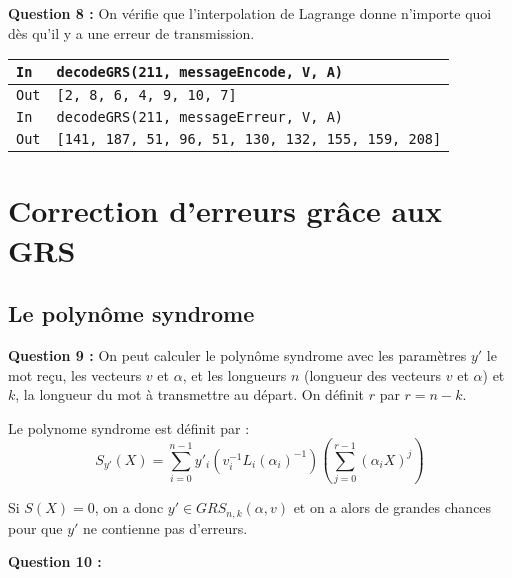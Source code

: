 \documentclass[titlepage]{article}
\begin{document}
        \textbf{Question 8 :}
        On vérifie que l'interpolation de Lagrange donne n'importe quoi dès qu'il y a une erreur de transmission.

        \begin{tabularx}{12cm}{|p{0.60cm}|X|}
            \hline
            \rowcolor{gray}
            \texttt{In}
            & 
            \texttt{decodeGRS(211, messageEncode, V, A)}
            \\
            \hline
            \texttt{Out}
            &
            \texttt{[2, 8, 6, 4, 9, 10, 7]}
            \\
            \hline
            \rowcolor{gray}
            \texttt{In}
            & 
            \texttt{decodeGRS(211, messageErreur, V, A)}
            \\
            \hline
            \texttt{Out}
            &
            \texttt{[141, 187, 51, 96, 51, 130, 132, 155, 159, 208]}
            \\
            \hline
        \end{tabularx}
        \bigbreak

    \section{Correction d’erreurs grâce aux GRS}
        \subsection{Le polynôme syndrome}
        \textbf{Question 9 :}
        On peut calculer le polynôme syndrome avec les paramètres $y'$ le mot reçu, les vecteurs $v$ et $\alpha$, 
        et les longueurs $n$ (longueur des vecteurs $v$ et $\alpha$) et $k$, la longueur du mot à transmettre au départ. 
        On définit $r$ par $r = n - k$.

        Le polynome syndrome est définit par : 
        \[S_{y'}(X) = \sum_{i = 0}^{n - 1}y'_i(v_i^{-1}L_i(\alpha_i)^{-1})(\sum_{j = 0}^{r - 1}(\alpha_iX)^j)\]

        Si $S(X) = 0$, on a donc $y' \in GRS_{n,k}(\alpha,v)$ et on a alors de grandes chances pour que $y'$ ne contienne pas d'erreurs.

        

        \textbf{Question 10 :}\bigbreak
\end{document}
